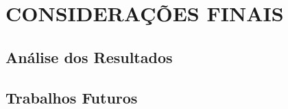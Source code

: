 \chapter{CONSIDERAÇÕES FINAIS}

\section{Análise dos Resultados} %
\label{sec:analise_resultados}

\section{Trabalhos Futuros} %
\label{sec:trabalhos_futuros}

